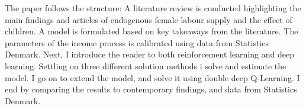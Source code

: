 The paper follows the structure: A literature review is conducted highlighting the main findings and articles of endogenous female labour supply and the effect of children. A model is formulated based on key takeaways from the literature. The parameters of the income process is calibrated using data from Statistics Denmark. Next, I introduce the reader to both reinforcement learning and deep learning. Settling on three different solution methods i solve and estimate the model. I go on to extend the model, and solve it using double deep Q-Learning. I end by comparing the results to contemporary findings, and data from Statistics Denmark.